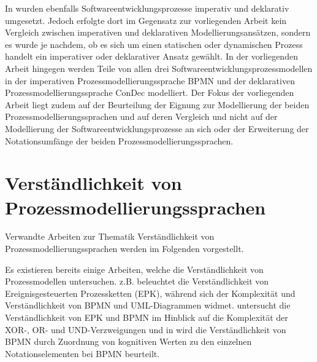  In \cite{sabrina795, sabrina734, sabrina758} wurden ebenfalls Softwareentwicklungsprozesse imperativ und deklarativ umgesetzt. Jedoch erfolgte dort im Gegensatz zur vorliegenden Arbeit kein Vergleich zwischen imperativen und deklarativen Modellierungsansätzen, sondern es wurde je nachdem, ob es sich um einen statischen oder dynamischen Prozess handelt ein imperativer oder deklarativer Ansatz gewählt.\newline
In der vorliegenden Arbeit hingegen werden Teile von allen drei Softwareentwicklungsprozessmodellen in der imperativen Prozessmodellierungssprache BPMN und der deklarativen Prozessmodellierungssprache ConDec modelliert. Der Fokus der vorliegenden Arbeit liegt zudem auf der Beurteilung der Eignung zur Modellierung der beiden Prozessmodellierungssprachen und auf deren Vergleich und nicht auf der Modellierung der Softwareentwicklungsprozesse an sich oder der Erweiterung der Notationsumfänge der beiden Prozessmodellierungssprachen.\newline


\section{Verständlichkeit von Prozessmodellierungssprachen}

Verwandte Arbeiten zur Thematik Verständlichkeit von Prozessmodellierungssprachen werden im Folgenden vorgestellt.

Es existieren bereits einige Arbeiten, welche die Verständlichkeit von Prozessmodellen untersuchen. \cite{bpm07} z.B. beleuchtet die Verständlichkeit von Ereignisgesteuerten Prozessketten (EPK), während sich \cite{gruhn2006complexity} der Komplexität und Verständlichkeit von BPMN und UML-Diagrammen widmet. \cite{reijers2011study} untersucht die Verständlichkeit von EPK und BPMN im Hinblick auf die Komplexität der XOR-, OR- und UND-Verzweigungen und in\cite{gruhn2006adopting} wird die Verständlichkeit von BPMN durch Zuordnung von kognitiven Werten zu den einzelnen Notationselementen bei BPMN beurteilt. \newline

